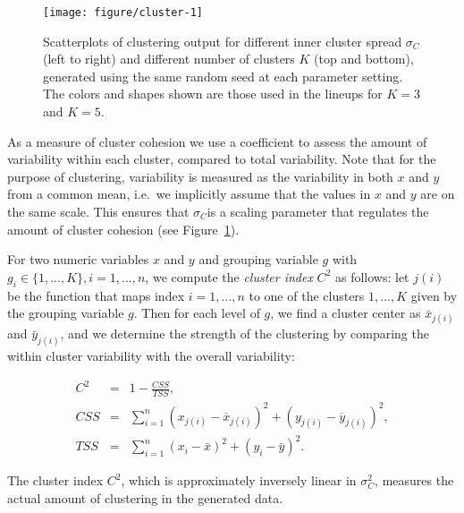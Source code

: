 \documentclass[12pt]{article}\usepackage[]{graphicx}\usepackage[]{color}
\newenvironment{knitrout}{}{} %
\begin{document}
\begin{figure}[bht]
\begin{knitrout}
\color{fgcolor}

{\centering \texttt{[image: figure/cluster-1]} 

}



\end{knitrout}
\caption[Parameters affecting $M_C$]{\label{fig:clusters} 
Scatterplots of clustering output for different inner cluster spread $\sigma_C$  (left to right) and different number of clusters $K$ (top and bottom), generated using the same random seed at each parameter setting. 
The colors and shapes shown are those used in the lineups for $K=3$ and $K=5$.}
\end{figure}
As a measure of cluster cohesion we use a coefficient to assess the amount of variability within each cluster, compared to total variability. 
Note that for the purpose of clustering, variability is measured as the variability in both $x$ and $y$ from a common mean, i.e.\ we implicitly assume that the values in $x$ and $y$ are on the same scale. 
This ensures that $\sigma_C$is a scaling parameter that regulates the amount of cluster cohesion (see Figure~\ref{fig:clusters}).  

For two numeric variables $x$ and $y$ and grouping variable $g$ with $g_i \in \{1, ..., K\}, i = 1, ..., n$, we compute the  {\it cluster index} $C^2$ as follows: 
let $j(i)$ be the function that maps index $i = 1, ..., n$ to one of the clusters $1, ..., K$ given by the grouping variable $g$. 
Then for each  level of $g$, we find  a cluster center as $\bar{x}_{j(i)}$ and  $\bar{y}_{j(i)}$, and we determine the strength of the clustering by comparing the within cluster variability with the overall variability: 

\begin{eqnarray}\label{eq:clusterMeasure}
C^2 &=& 1 - \frac{CSS}{TSS},\\
\nonumber CSS &=& \sum_{i=1}^n \left(x_{j(i)} - \overline{x}_{j(i)}\right)^2 + \left(y_{j(i)} - \overline{y}_{j(i)} \right)^2, \\
\nonumber TSS &=& \sum_{i=1}^n \left(x_i - \bar{x}\right)^2 + \left(y_i - \bar{y}\right)^2.
\end{eqnarray}

The cluster index $C^2$, which is approximately inversely linear in $\sigma_C^2$, measures the actual amount of clustering in the generated data.
\end{document}
